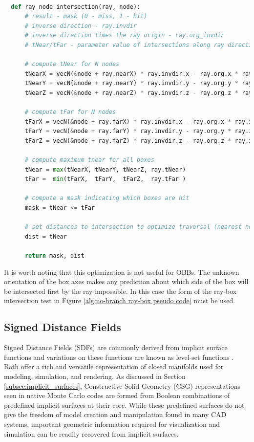 \begin{lstlisting}[language=Python,basicstyle=\tiny,caption={A non-branching
      ray-node intersection test for a quad tree implementation with pre-computed
      near and far box coordinate values.},
    label={alg:no-branch ray-box optimized},captionpos=b]

  def ray_node_intersection(ray, node):
      # result - mask (0 - miss, 1 - hit)
      # inverse direction - ray.invdir
      # inverse direction times the ray origin - ray.org_invdir
      # tNear/tFar - parameter value of intersections along ray direction
  
      # compute tNear for N nodes
      tNearX = vecN(&node + ray.nearX) * ray.invdir.x - ray.org.x * ray.invdir.x
      tNearY = vecN(&node + ray.nearY) * ray.invdir.y - ray.org.y * ray.invdir.y
      tNearZ = vecN(&node + ray.nearZ) * ray.invdir.z - ray.org.z * ray.invdir.z

      # compute tFar for N nodes
      tFarX = vecN(&node + ray.farX) * ray.invdir.x - ray.org.x * ray.invdir.x
      tFarY = vecN(&node + ray.farY) * ray.invdir.y - ray.org.y * ray.invdir.y
      tFarZ = vecN(&node + ray.farZ) * ray.invdir.z - ray.org.z * ray.invdir.z

      # compute maximum tnear for all boxes
      tNear = max(tNearX, tNearY, tNearZ, ray.tNear) 
      tFar =  min(tFarX,  tFarY,  tFarZ,  ray.tFar )

      # compute a mask indicating which boxes are hit
      mask = tNear <= tFar

      # set distances to intersection to optimize traversal (nearest nodes first)
      dist = tNear

      return mask, dist
\end{lstlisting}

It is worth noting that this optimization is not useful for OBBs. The unknown
orientation of the box axes makes any prediction about which side of the box
will be intersected first by the ray impossible. In this case the form of the
ray-box intersection test in Figure \ref{alg:no-branch ray-box pseudo code} must
be used.


\subsection{Signed Distance Fields}

Signed Distance Fields (SDFs) are commonly derived from implicit surface
functions and variations on these functions are known as level-set functions
\cite{Osher_2003}. Both offer a rich and versatile representation of closed
manifolds used for modeling, simulation, and rendering. As discussed in Section
\ref{subsec:implicit_surfaces}, Constructive Solid Geometry (CSG)
representations seen in native Monte Carlo codes are formed from Boolean
combinations of predefined implicit surfaces at their core. While these
predefined surfaces do not give the freedom of model creation and manipulation
found in many CAD systems, important geometric information required for
visualization and simulation can be readily recovered from implicit surfaces.

